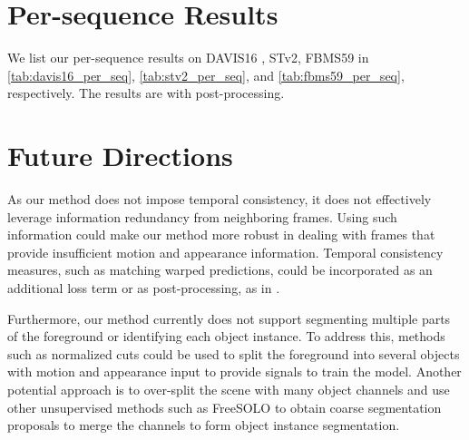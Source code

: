 \section{Per-sequence Results}

We list our per-sequence results on DAVIS16 \cite{perazzi2016benchmark}, STv2\cite{li2013video}, FBMS59\cite{brox2010freiburg,ochs2013segmentation} in \cref{tab:davis16_per_seq}, \cref{tab:stv2_per_seq}, and \cref{tab:fbms59_per_seq}, respectively. The results are with post-processing.

\section{Future Directions}
As our method does not impose temporal consistency, it does not effectively leverage information redundancy from neighboring frames. Using such information could make our method more robust in dealing with frames that provide insufficient motion and appearance information. Temporal consistency measures, such as matching warped predictions, could be incorporated as an additional loss term or as post-processing, as in \cite{yang2019unsupervised}.

Furthermore, our method currently does not support segmenting multiple parts of the foreground or identifying each object instance. To address this, methods such as normalized cuts \cite{shi2000normalized} could be used to split the foreground into several objects with motion and appearance input to provide signals to train the model. Another potential approach is to over-split the scene with many object channels and use other unsupervised methods such as FreeSOLO \cite{wang2021dense, wang2022freesolo} to obtain coarse segmentation proposals to merge the channels to form object instance segmentation.

\FloatBarrier

\clearpage
